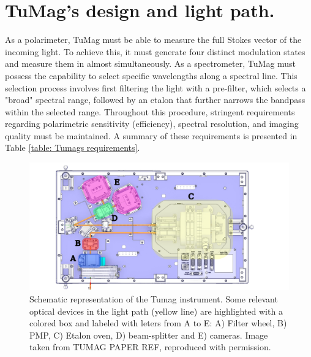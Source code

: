\section{TuMag's design and light path.}

As a polarimeter, TuMag must be able to measure the full Stokes vector of the incoming light. To achieve this, it must generate four distinct modulation states and measure them in almost simultaneously. As a spectrometer, TuMag must possess the capability to select specific wavelengths along a spectral line. This selection process involves first filtering the light with a pre-filter, which selects a "broad" spectral range, followed by an etalon that further narrows the bandpass within the selected range. Throughout this procedure, stringent requirements regarding polarimetric sensitivity (efficiency), spectral resolution, and imaging quality must be maintained. A summary of these requirements is presented in Table \ref{table: Tumags requirements}.

\begin{figure}[t]
    \includegraphics[width=\textwidth]{figures/TuMag/Scheme.pdf}
    \caption{Schematic representation of the Tumag instrument. Some relevant optical devices in the light path (yellow line) are highlighted with a colored box and labeled with leters from A to E: A) Filter wheel, B) PMP, C) Etalon oven, D) beam-splitter and E) cameras. Image taken from TUMAG PAPER REF, reproduced with permission.      
    \label{fig_tumag:scheme}}
\end{figure}

